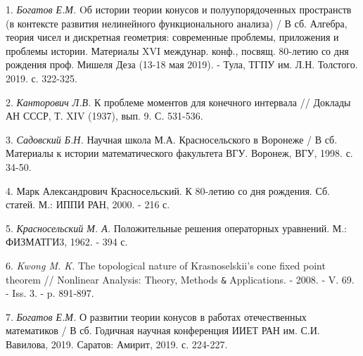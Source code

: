 \litlist

1. \textit{Богатов Е.М.} Oб истории теории конусов и полуупорядоченных пространств (в контексте развития нелинейного функционального анализа) / В сб. Алгебра, теория чисел и дискретная геометрия: современные проблемы, приложения и проблемы истории. Материалы XVI междунар. конф., посвящ. 80-летию со дня рождения проф. Мишеля Деза (13-18 мая 2019). - Тула, ТГПУ им. Л.Н. Толстого. 2019. с. 322-325.

2. \textit{Канторович Л.В.} К проблеме моментов для конечного интервала // Доклады АН СССР, Т. XIV (1937), вып. 9. С. 531-536.

3. \textit{Садовский Б.Н.} Научная школа М.А. Красносельского в Воронеже / В сб. Материалы к истории математического факультета ВГУ. Воронеж, ВГУ, 1998. с. 34-50.

4. Марк Александрович Красносельский. К 80-летию со дня рождения. Сб. статей. М.: ИППИ РАН, 2000. - 216 с.

5. \textit{Красносельский М. А.} Положительные решения операторных уравнений. М.: ФИЗМАТГИ3, 1962. - 394 с.

6. \textit{Kwong M. K.} The topological nature of Krasnoselskii's cone fixed point theorem // Nonlinear Analysis: Theory, Methods \verb'&' Applications. - 2008. - V. 69. - Iss. 3. - p. 891-897.

7. \textit{Богатов Е.М.} О развитии теории конусов в работах отечественных математиков / В сб. Годичная научная конференция ИИЕТ РАН им. С.И. Вавилова, 2019. Саратов: Амирит, 2019. с. 224-227.
